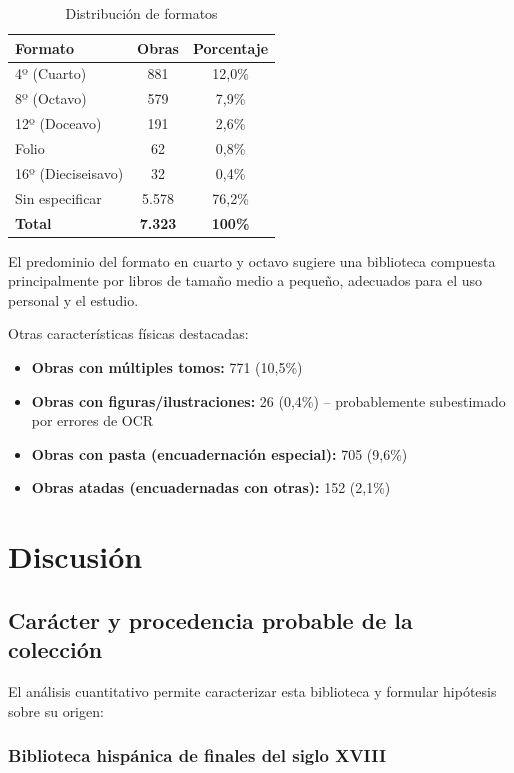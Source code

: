 \documentclass[12pt,a4paper]{article}
\begin{document}
\begin{table}[h]
\centering
\caption{Distribución de formatos}
\label{tab:formatos}
\begin{tabular}{lcc}
\toprule
\textbf{Formato} & \textbf{Obras} & \textbf{Porcentaje} \\
\midrule
4º (Cuarto) & 881 & 12,0\% \\
8º (Octavo) & 579 & 7,9\% \\
12º (Doceavo) & 191 & 2,6\% \\
Folio & 62 & 0,8\% \\
16º (Dieciseisavo) & 32 & 0,4\% \\
Sin especificar & 5.578 & 76,2\% \\
\midrule
\textbf{Total} & \textbf{7.323} & \textbf{100\%} \\
\bottomrule
\end{tabular}
\end{table}

El predominio del formato en cuarto y octavo sugiere una biblioteca compuesta principalmente por libros de tamaño medio a pequeño, adecuados para el uso personal y el estudio.

Otras características físicas destacadas:

\begin{itemize}
    \item \textbf{Obras con múltiples tomos:} 771 (10,5\%)
    \item \textbf{Obras con figuras/ilustraciones:} 26 (0,4\%) – probablemente subestimado por errores de OCR
    \item \textbf{Obras con pasta (encuadernación especial):} 705 (9,6\%)
    \item \textbf{Obras atadas (encuadernadas con otras):} 152 (2,1\%)
\end{itemize}

\section{Discusión}

\subsection{Carácter y procedencia probable de la colección}

El análisis cuantitativo permite caracterizar esta biblioteca y formular hipótesis sobre su origen:

\subsubsection{Biblioteca hispánica de finales del siglo XVIII}
\end{document}
